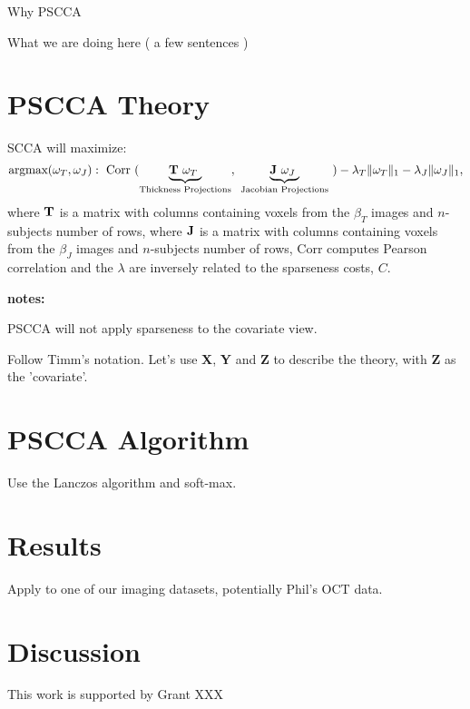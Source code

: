 \documentclass{llncs}
\begin{document}
Why PSCCA

What we are doing here ( a few sentences )

\section{PSCCA Theory}
SCCA will maximize:
\begin{equation}
\text{argmax}( \omega_T,\omega_{J}) :
 ~\text{Corr}~(\underbrace{  {\bf T} ~\omega_T~}_{\text{Thickness Projections}} ,~\underbrace{ {\bf J} ~\omega_{J}~}_{\text{Jacobian Projections}}~) - \lambda_T \| \omega_T \|_1 - \lambda_J \|  \omega_{J}  \|_1 , 
\end{equation} 
where ${\bf T}$ is a matrix with columns containing voxels from the $\beta_T$ images and $n$-subjects number of rows, 
where ${\bf J}$ is a matrix with columns containing voxels from the $\beta_J$ images and $n$-subjects number of rows, 
 Corr computes Pearson correlation and the
$\lambda$ are inversely related to the sparseness costs, $C$.  %

{\bf notes:}

PSCCA will not apply sparseness to the covariate view.  

Follow Timm's notation.  Let's use {\bf  X}, {\bf Y} and {\bf Z} to describe the theory, with {\bf Z} as the
'covariate'.   

\section{PSCCA Algorithm}
Use the Lanczos algorithm and soft-max.

\section{Results}
Apply to one of our imaging datasets, potentially Phil's OCT data.

\section{Discussion}

 This work is supported by Grant XXX 

% 
\end{document}
